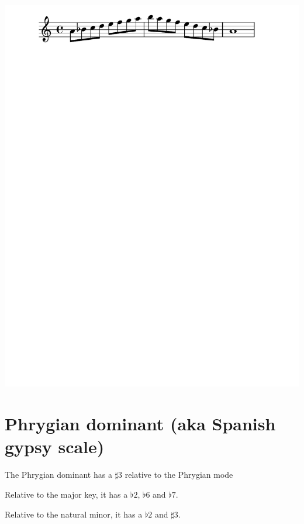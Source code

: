 \documentclass[11pt]{article}
\begin{document}
\begin{center}
\includegraphics[width=.9\linewidth]{a_phrygian_mode.pdf}
\end{center}

\section*{Phrygian dominant (aka Spanish gypsy scale)}
\label{sec:org980f80a}

The Phrygian dominant has a \(\sharp{3}\) relative to the Phrygian mode

Relative to the major key, it has a \(\flat{2}\), \(\flat{6}\)  and \(\flat{7}\).

Relative to the natural minor, it has a \(\flat{2}\) and \(\sharp{3}\).
\end{document}
